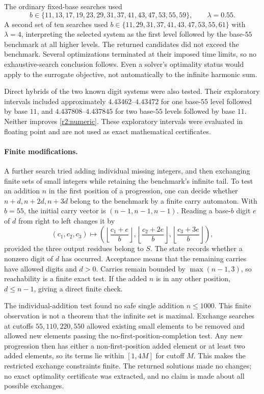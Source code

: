 The ordinary fixed-base searches used
\[
b\in\{11,13,17,19,23,29,31,37,41,43,47,53,55,59\},
\qquad\lambda=0.55.
\]
A second set of ten searches used $b\in\{11,29,31,37,41,43,47,53,55,61\}$ with $\lambda=4$, interpreting the selected system as the first level followed by the base-$55$ benchmark at all higher levels. The returned candidates did not exceed the benchmark. Several optimizations terminated at their imposed time limits, so no exhaustive-search conclusion follows. Even a solver's optimality status would apply to the surrogate objective, not automatically to the infinite harmonic sum.

Direct hybrids of the two known digit systems were also tested. Their exploratory intervals included approximately $4.43462$--$4.43472$ for one base-$55$ level followed by base $11$, and $4.437808$--$4.437845$ for two base-$55$ levels followed by base $11$. Neither improves \eqref{r2:numeric}. These exploratory intervals were evaluated in floating point and are not used as exact mathematical certificates.

\paragraph{Finite modifications.}
A further search tried adding individual missing integers, and then exchanging finite sets of small integers while retaining the benchmark's infinite tail. To test an addition $n$ in the first position of a progression, one can decide whether $n+d,n+2d,n+3d$ belong to the benchmark by a finite carry automaton. With $b=55$, the initial carry vector is $(n-1,n-1,n-1)$. Reading a base-$b$ digit $e$ of $d$ from right to left changes it by
\[
(c_1,c_2,c_3)\longmapsto
\left(\left\lfloor\frac{c_1+e}{b}\right\rfloor,
\left\lfloor\frac{c_2+2e}{b}\right\rfloor,
\left\lfloor\frac{c_3+3e}{b}\right\rfloor\right),
\]
provided the three output residues belong to $S$. The state records whether a nonzero digit of $d$ has occurred. Acceptance means that the remaining carries have allowed digits and $d>0$. Carries remain bounded by $\max(n-1,3)$, so reachability is a finite exact test. If the added $n$ is in any other position, $d\le n-1$, giving a direct finite check.

The individual-addition test found no safe single addition $n\le1000$. This finite observation is not a theorem that the infinite set is maximal. Exchange searches at cutoffs $55,110,220,550$ allowed existing small elements to be removed and allowed new elements passing the no-first-position-completion test. Any new progression then has either a non-first-position added element or at least two added elements, so its terms lie within $[1,4M]$ for cutoff $M$. This makes the restricted exchange constraints finite. The returned solutions made no changes; no exact optimality certificate was extracted, and no claim is made about all possible exchanges.

